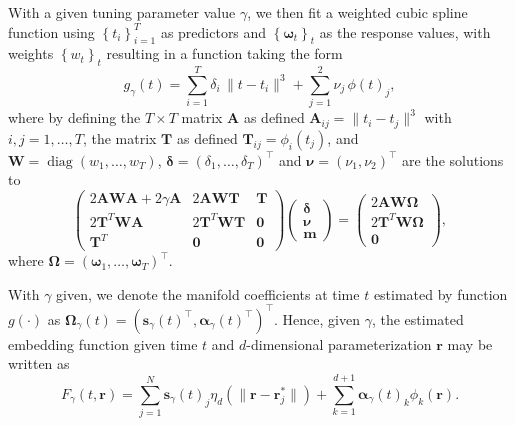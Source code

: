 \documentclass[11pt,reqno]{article}
\newcommand{\T}{\intercal}
\theoremstyle{definition}
\begin{document}
With a given tuning parameter value $\gamma$, we then fit a weighted cubic spline function using $\left\{t_i\right\}_{i=1}^T$ as predictors and $\left\{\mathbf{\omega}_t\right\}_t$ as the response values, with weights $\left\{w_t\right\}_t$ resulting in a function taking the form
\begin{equation}\nonumber
  g_{\gamma}(t) = \sum_{i=1}^{T}\delta_i \,\|t - t_i\|^{3} + \sum_{j=1}^{2}\nu_j\,\phi(t)_j,
\end{equation}
where by defining the $T \times T$ matrix $\boldsymbol{A}$ as defined  $\boldsymbol{A}_{ij} = \|t_i - t_j\|^{3}$ with $i,j = 1,\ldots, T$, the matrix $\boldsymbol{T}$ as defined $\boldsymbol{T}_{ij} = \phi_i(t_j)$, and $\boldsymbol{W} = \operatorname{diag}(w_1, \dots, w_T)$,  $\boldsymbol{\delta}=(\delta_1,\ldots,\delta_T)^\T$ and $\boldsymbol{\nu}=(\nu_1,\nu_2)^\T$ are the solutions to 
\begin{equation}
  \left(
  \begin{array}{ccc}
    2\boldsymbol{A}\boldsymbol{W}\boldsymbol{A} + 2\gamma\boldsymbol{A} & 2\boldsymbol{A}\boldsymbol{W}\boldsymbol{T} & \boldsymbol{T} \\
    2\boldsymbol{T}^{T}\boldsymbol{W}\boldsymbol{A} & 2\boldsymbol{T}^{T}\boldsymbol{W}\boldsymbol{T} & \boldsymbol{0} \\
    \boldsymbol{T}^{T} & \boldsymbol{0} & \boldsymbol{0}
  \end{array}
  \right)\left(
  \begin{array}{c}
    \boldsymbol{\delta} \\
    \boldsymbol{\nu} \\
    \boldsymbol{m}
  \end{array}
  \right) = \left(
  \begin{array}{c}
    2\boldsymbol{A}\boldsymbol{W}\boldsymbol{\Omega} \\
    2\boldsymbol{T}^{T}\boldsymbol{W}\boldsymbol{\Omega} \\
    \boldsymbol{0}
  \end{array}
  \right), \label{eq:16}
\end{equation}
where $\boldsymbol{\Omega}=(\boldsymbol{\omega}_1,\ldots, \boldsymbol{\omega}_T)^\T$.

With $\gamma$ given, we denote the manifold coefficients at time $t$ estimated by function $g(\cdot)$ as $\boldsymbol{\Omega}_{\gamma}(t) = \left(\boldsymbol{s}_{\gamma}(t)^\T, \boldsymbol{\alpha}_{\gamma}(t)^\T\right)^\T$. Hence, given $\gamma$, the estimated embedding function given time $t$ and $d$-dimensional parameterization $\boldsymbol{r}$ may be written as
\begin{equation}
  F_{\gamma}(t, \boldsymbol{r}) = \sum_{j=1}^{N}\boldsymbol{s}_{\gamma}(t)_j \eta_{d}\left(\|\boldsymbol{r} - \boldsymbol{r}_j^*\|\right) + \sum_{k=1}^{d+1}\boldsymbol{\alpha}_{\gamma}(t)_k \phi_k(\boldsymbol{r}). \label{eq:17}
\end{equation}
\end{document}
